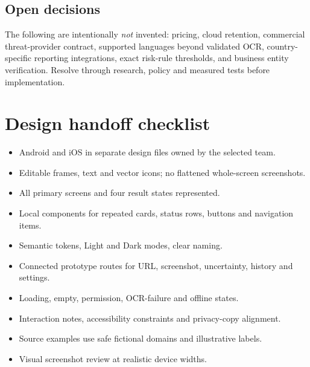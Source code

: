 \documentclass[10pt,a4paper]{article}
\begin{document}
\subsection{Open decisions}
The following are intentionally \emph{not} invented: pricing, cloud retention, commercial threat-provider contract, supported languages beyond validated OCR, country-specific reporting integrations, exact risk-rule thresholds, and business entity verification. Resolve through research, policy and measured tests before implementation.

\section{Design handoff checklist}
\begin{itemize}
\item[$\square$] Android and iOS in separate design files owned by the selected team.
\item[$\square$] Editable frames, text and vector icons; no flattened whole-screen screenshots.
\item[$\square$] All primary screens and four result states represented.
\item[$\square$] Local components for repeated cards, status rows, buttons and navigation items.
\item[$\square$] Semantic tokens, Light and Dark modes, clear naming.
\item[$\square$] Connected prototype routes for URL, screenshot, uncertainty, history and settings.
\item[$\square$] Loading, empty, permission, OCR-failure and offline states.
\item[$\square$] Interaction notes, accessibility constraints and privacy-copy alignment.
\item[$\square$] Source examples use safe fictional domains and illustrative labels.
\item[$\square$] Visual screenshot review at realistic device widths.
\end{itemize}
\end{document}
